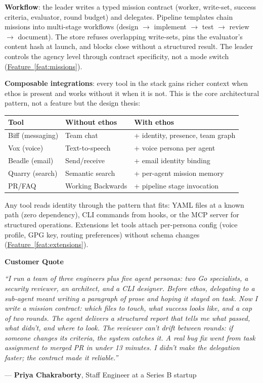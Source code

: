 \documentclass[11pt,letterpaper]{article}
\newcommand{\prsection}[1]{%
  \vspace{1em}%
  {\large\bfseries\color{SectionBlue}#1}%
  \vspace{0.3em}\par%
}
\newcommand{\featureref}[1]{\hyperref[#1]{Feature~\ref*{#1}}}
\begin{document}
\textbf{Workflow}: the leader writes a typed mission contract (worker, write-set, success criteria, evaluator, round budget) and delegates. Pipeline templates chain missions into multi-stage workflows (design $\to$ implement $\to$ test $\to$ review $\to$ document). The store refuses overlapping write-sets, pins the evaluator's content hash at launch, and blocks close without a structured result. The leader controls the agency level through contract specificity, not a mode switch (\featureref{feat:missions}).

\textbf{Composable integrations}: every tool in the stack gains richer context when ethos is present and works without it when it is not. This is the core architectural pattern, not a feature but the design thesis:

\noindent\begin{tabularx}{\textwidth}{@{} l X X @{}}
\toprule
\textbf{Tool} & \textbf{Without ethos} & \textbf{With ethos} \\
\midrule
Biff (messaging) & Team chat & + identity, presence, team graph \\
Vox (voice) & Text-to-speech & + voice persona per agent \\
Beadle (email) & Send/receive & + email identity binding \\
Quarry (search) & Semantic search & + per-agent mission memory \\
PR/FAQ & Working Backwards & + pipeline stage invocation \\
\bottomrule
\end{tabularx}

\vspace{0.5em}
\noindent Any tool reads identity through the pattern that fits: YAML files at a known path (zero dependency), CLI commands from hooks, or the MCP server for structured operations. Extensions let tools attach per-persona config (voice profile, GPG key, routing preferences) without schema changes (\featureref{feat:extensions}).

\prsection{Customer Quote}

\begin{customerquote}
\textit{``I run a team of three engineers plus five agent personas: two Go specialists, a security reviewer, an architect, and a CLI designer. Before ethos, delegating to a sub-agent meant writing a paragraph of prose and hoping it stayed on task. Now I write a mission contract: which files to touch, what success looks like, and a cap of two rounds. The agent delivers a structured report that tells me what passed, what didn't, and where to look. The reviewer can't drift between rounds: if someone changes its criteria, the system catches it. A real bug fix went from task assignment to merged PR in under 13 minutes. I didn't make the delegation faster; the contract made it reliable.''}

\raggedleft --- \textbf{Priya Chakraborty}, Staff Engineer at a Series B startup
\end{customerquote}
\end{document}
